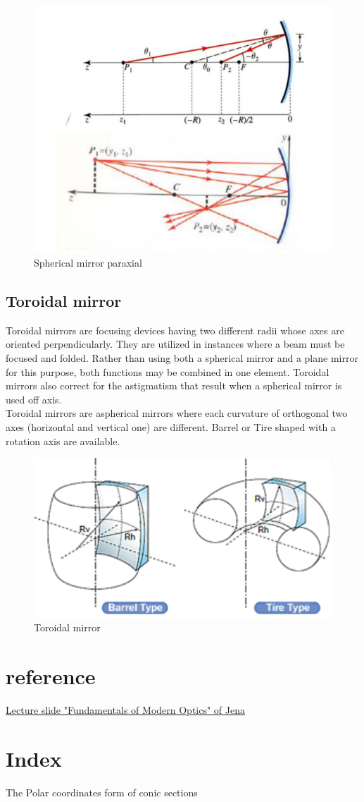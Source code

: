 \documentclass[../main.tex]{subfiles}
\begin{document}
	\begin{figure}[h!]
	  \centering
	  \includegraphics[scale=0.7]{../graphics/Optical_components5.png}
	  \caption{Spherical mirror paraxial}
	  \label{fig:mirror5}
	\end{figure}
	\FloatBarrier
	\subsection{Toroidal mirror}
	Toroidal mirrors are focusing devices having two different radii whose axes are oriented perpendicularly. They are utilized in instances where a beam must be focused and folded. Rather than using both a spherical mirror and a plane mirror for this purpose, both functions may be combined in one element. Toroidal mirrors also correct for the astigmatism that result when a spherical mirror is used off axis.\\
	Toroidal mirrors are aspherical mirrors where each curvature of orthogonal two axes (horizontal and vertical one) are different. Barrel or Tire shaped with a rotation axis are available.
	\begin{figure}[h!]
	  \centering
	  \includegraphics[scale=0.7]{../graphics/Optical_components7.png}
	  \caption{Toroidal mirror}
	  \label{fig:Toroidal}
	\end{figure}
	\section{reference}
	\href{http://www.iap.uni-jena.de/iapmedia/de/Lecture/Fundamentals+of+Modern+Optics1427752800/FoMO14_Script_2015_02_14s.pdf}{Lecture slide "Fundamentals of Modern Optics" of Jena}
	\section{Index}
	The Polar coordinates form of conic sections 
\end{document}
